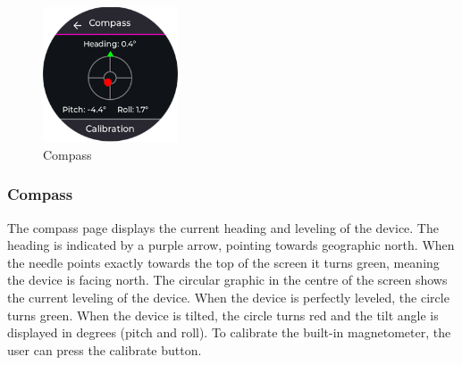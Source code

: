 \begin{minipage}{\linewidth}
	\begin{figure}
		\vspace{-0.6cm}
		\includegraphics[width=4cm]{images/6_design_final/gui/08_compass.png}
		\centering
		\caption{Compass}
		\label{fig:final_design_gui_compass}
	\end{figure}
	\subsubsection{Compass}
	The compass page displays the current heading and leveling of the device.
	The heading is indicated by a purple arrow, pointing towards geographic north.
	When the needle points exactly towards the top of the screen it turns green, meaning the device is facing north.
	The circular graphic in the centre of the screen shows the current leveling of the device.
	When the device is perfectly leveled, the circle turns green.
	When the device is tilted, the circle turns red and the tilt angle is displayed in degrees (pitch and roll).
	To calibrate the built-in magnetometer, the user can press the calibrate button.
\end{minipage}
\vspace{-0.2cm}

